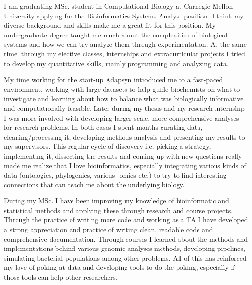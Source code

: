 \documentclass[11pt, a4paper]{./Awesome-CV/awesome-cv}
\begin{document}
\makelettertitle %

\begin{cvletter}

    I am graduating MSc. student in Computational Biology at Carnegie Mellon University
applying for the Bioinformatics Systems Analyst position.
I think my diverse background and skills make me a great fit for this position.
My undergraduate degree taught me much about the complexities of biological systems and how we can try analyze them through experimentation.
At the same time, through my elective classes, internships and extracurricular projects I tried to develop my quantitative skills, mainly programming and analyzing data.

My time working for the start-up Adapsyn introduced me to a fast-paced environment, working with large datasets to help guide biochemists on what to investigate and learning about how to balance what was biologically informative and computationally feasible.
Later during my thesis and my research internship I was more involved with developing larger-scale, more comprehensive analyses for research problems.
In both cases I spent months curating data, cleaning/processing it, developing methods analysis and presenting my results to my supervisors.
This regular cycle of discovery i.e. picking a strategy, implementing it, dissecting the results and coming up with new questions really made me realize that I love bioinformatics, especially integrating various kinds of data (ontologies, phylogenies, various -omics etc.) to try to find interesting connections that can teach me about the underlying biology.

During my MSc. I have been improving my knowledge of bioinformatic and statistical methods and applying these through research and course projects.
Through the practice of writing more code and working as a TA I have developed a strong appreciation and practice of writing clean, readable code and comprehensive documentation.
Through courses I learned about the methods and implementations behind various genomic analyses methods, developing pipelines, simulating bacterial populations among other problems.
All of this has reinforced my love of poking at data and developing tools to do the poking, especially if those tools can help other researchers.


\end{cvletter}
\end{document}
